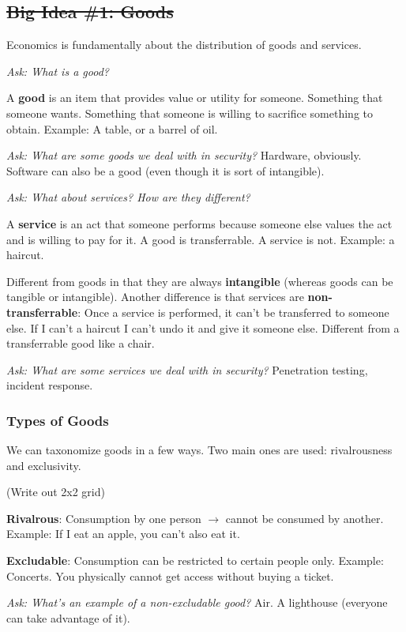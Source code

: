 \documentclass[11pt]{article}
\begin{document}
\subsection{\sout{Big Idea \#1: Goods}}

Economics is fundamentally about the distribution of goods and services. 

{\it Ask: What is a good?}

A {\bf good} is an item that provides value or utility for someone. Something that someone wants. Something that someone is willing to sacrifice something to obtain. Example: A table, or a barrel of oil.

{\it Ask: What are some goods we deal with in security?} Hardware, obviously. Software can also be a good (even though it is sort of intangible).

{\it Ask: What about services? How are they different?}

A {\bf service} is an act that someone performs because someone else values the act and is willing to pay for it. 
A good is transferrable. A service is not. 
Example: a haircut.

Different from goods in that they are always {\bf intangible} (whereas goods can be tangible or intangible). 
Another difference is that services are {\bf non-transferrable}: Once a service is performed, it can't be transferred to someone else. 
If I can't a haircut I can't undo it and give it someone else.
Different from a transferrable good like a chair.

{\it Ask: What are some services we deal with in security?} Penetration testing, incident response. 

\subsubsection{Types of Goods}

We can taxonomize goods in a few ways.
Two main ones are used: rivalrousness and exclusivity.

(Write out 2x2 grid)

{\bf Rivalrous}: Consumption by one person $\rightarrow$ cannot be consumed by another.
Example: If I eat an apple, you can't also eat it.  

{\bf Excludable}: Consumption can be restricted to certain people only. 
Example: Concerts. You physically cannot get access without buying a ticket.

{\it Ask: What's an example of a non-excludable good?} Air. A lighthouse (everyone can take advantage of it).
\end{document}
